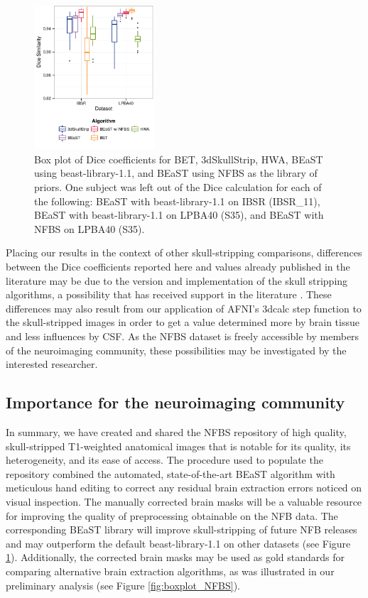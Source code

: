 \begin{figure}[ht!]
\includegraphics[width=0.4\textwidth]{boxplot_IL.pdf}
    \caption{
Box plot of Dice coefficients for BET, 3dSkullStrip, HWA, BEaST using beast-library-1.1, and BEaST using NFBS as the library of priors. One subject was left out of the Dice calculation for each of the following: BEaST with beast-library-1.1 on IBSR (IBSR\_11), BEaST with beast-library-1.1 on LPBA40 (S35), and BEaST with NFBS on LPBA40 (S35).}
\label{fig:boxplot_I&L}
\end{figure}

Placing our results in the context of other skull-stripping comparisons, differences between the Dice coefficients reported here and values already published in the literature may be due to the version and implementation of the skull stripping algorithms, a possibility that has received support in the literature \cite{Iglesias2011}. These differences may also result from our application of AFNI's 3dcalc step function to the skull-stripped images in order to get a value determined more by brain tissue and less influences by CSF. As the NFBS dataset is freely accessible by members of the neuroimaging community, these possibilities may be investigated by the interested researcher.

\subsection*{Importance for the neuroimaging community}

In summary, we have created and shared the NFBS repository of high quality, skull-stripped T1-weighted anatomical images that is notable for its quality, its heterogeneity, and its ease of access. The procedure used to populate the repository combined the automated, state-of-the-art BEaST algorithm with  meticulous hand editing to correct any residual brain extraction errors noticed on visual inspection. The manually corrected brain masks will be a valuable resource for improving the quality of preprocessing obtainable on the NFB data. The corresponding BEaST library will improve skull-stripping of future NFB releases and may outperform the default beast-library-1.1 on other datasets (see Figure \ref{fig:boxplot_I&L}). Additionally, the corrected brain masks may be used as gold standards for comparing alternative brain extraction algorithms, as was illustrated in our preliminary analysis (see Figure \ref{fig:boxplot_NFBS}).

